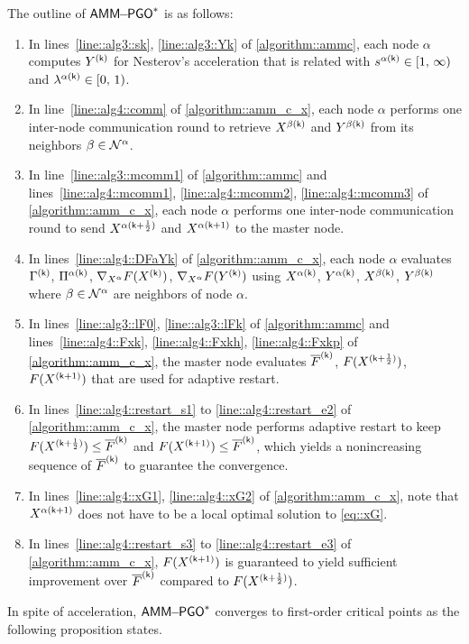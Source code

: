 The outline of  $\mathsf{AMM\!\!-\!\!PGO}^*$  is as follows:
\begin{enumerate}[leftmargin=0.45cm]
\item In lines~\ref{line::alg3::sk}, \ref{line::alg3::Yk} of \cref{algorithm::ammc}, each node $\alpha$ computes $Y^{(\mathsf{k})}$ for Nesterov's acceleration that is related with $s^{\alpha(\mathsf{k})}\in[1,\,\infty)$ and $\lambda^{\alpha(\mathsf{k})}\in[0,\,1)$.
\vspace{0.25em}
\item  In line~\ref{line::alg4::comm} of \cref{algorithm::amm_c_x}, each node $\alpha$ performs one inter-node communication round to retrieve $X^{\beta(\mathsf{k})}$ and $Y^{\beta(\mathsf{k})}$ from its neighbors $\beta\in\mathcal{N}^\alpha$.
\item  In line~\ref{line::alg3::mcomm1} of \cref{algorithm::ammc} and lines~\ref{line::alg4::mcomm1}, \ref{line::alg4::mcomm2}, \ref{line::alg4::mcomm3} of \cref{algorithm::amm_c_x}, each node $\alpha$ performs one inter-node communication round to send $X^{\alpha(\mathsf{k}+\frac{1}{2})}$ and $X^{\alpha(\mathsf{k}+1)}$ to the master node.
\vspace{0.2em}
\item In lines~\ref{line::alg4::DFaYk} of \cref{algorithm::amm_c_x}, each node $\alpha$ evaluates $\mathrm{\Gamma}^{(\mathsf{k})}$, $\mathrm{\Pi}^{\alpha(\mathsf{k})}$, $\nabla_{X^{\alpha}} F(X^{(\mathsf{k})})$, $\nabla_{X^{\alpha}} F(Y^{(\mathsf{k})})$ using $X^{\alpha(\mathsf{k})}$, $Y^{\alpha(\mathsf{k})}$, $X^{\beta(\mathsf{k})}$, $Y^{\beta(\mathsf{k})}$ where $\beta\in\mathcal{N}^\alpha$ are neighbors of node $\alpha$.
\item In lines~\ref{line::alg3::lF0}, \ref{line::alg3::lFk} of \cref{algorithm::ammc} and lines~\ref{line::alg4::Fxk}, \ref{line::alg4::Fxkh}, \ref{line::alg4::Fxkp} of \cref{algorithm::amm_c_x},  the master node evaluates  $\overline{F}^{(\mathsf{k})}$, $F(X^{(\mathsf{k}+\frac{1}{2})})$, $F(X^{(\mathsf{k}+1)})$ that are used for adaptive restart.
\vspace{0.2em}
\item In lines~\ref{line::alg4::restart_s1} to  \ref{line::alg4::restart_e2} of \cref{algorithm::amm_c_x}, the master node performs adaptive restart  to keep $F(X^{(\mathsf{k}+\frac{1}{2})})\leq \overline{F}^{(\mathsf{k})}$ and $F(X^{(\mathsf{k}+1)})\leq \overline{F}^{(\mathsf{k})}$, which yields a nonincreasing sequence of $\overline{F}^{(\mathsf{k})}$ to guarantee the convergence. 
\vspace{0.25em}
\item In lines~\ref{line::alg4::xG1}, \ref{line::alg4::xG2} of \cref{algorithm::amm_c_x}, note that $X^{\alpha(\mathsf{k}+1)}$ does not have to be a local optimal solution to \cref{eq::xG}.
\vspace{0.25em}
\item In lines~\ref{line::alg4::restart_s3} to \ref{line::alg4::restart_e3} of \cref{algorithm::amm_c_x}, $F(X^{(\mathsf{k}+1)})$ is guaranteed to yield sufficient improvement over $\overline{F}^{(\mathsf{k})}$ compared to $F(X^{(\mathsf{k}+\frac{1}{2})})$. %
\end{enumerate}
In spite of acceleration, $\mathsf{AMM\!\!-\!\!PGO}^*$  converges to first-order critical points  as the following proposition states.

